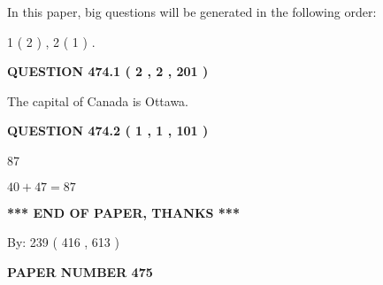 \documentclass[12pt]{article}
\begin{document}
In this paper, big questions will be generated in the following order: 
   
   
   1 ( 2 )
 ,
   2 ( 1 )
 .
  
\vspace{0.2in}
  
{\textbf{\Large{QUESTION
474.1 
 ( 2 , 2 , 201 )
}}}
  
  
 
 
\noindent{}
 
 
The capital of Canada is Ottawa.
 
 
 
 
  
\vspace{0.2in}
  
{\textbf{\Large{QUESTION
474.2 
 ( 1 , 1 , 101 )
}}}
  
  
 
 
\noindent{}

87
 
 
 
 
\noindent{}

$ %
40 +  %
47=   %
87$
 
 
   
   
 \vspace{0.2in}
 
   
   
   
   
\vspace{1.0in} 
{\textbf{\large{ *** END OF PAPER, THANKS *** }}} 
   
   
\hspace{1.0in} By: 
 239 ( 416 ,  613 )
   
   
   
   
\newpage 
\setcounter{page}{ 
   475001 } 
   
   
   
   
 {\textbf{ \Large{ PAPER NUMBER  475  }}}
   
   
\vspace{0.2in}
   
   
   
   
   
\end{document}
